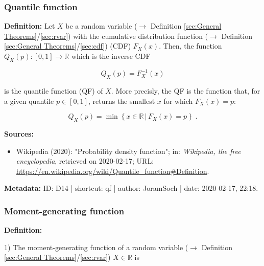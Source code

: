 \documentclass[a4paper,12pt,twoside]{book}
\begin{document}
\subsubsection[\textit{Quantile function}]{Quantile function} \label{sec:qf}
\setcounter{equation}{0}

\textbf{Definition:} Let $X$ be a random variable ($\rightarrow$ Definition \ref{sec:General Theorems}/\ref{sec:rvar}) with the cumulative distribution function ($\rightarrow$ Definition \ref{sec:General Theorems}/\ref{sec:cdf}) (CDF) $F_X(x)$. Then, the function $Q_X(p): [0,1] \to \mathbb{R}$ which is the inverse CDF

\begin{equation} \label{eq:qf-qf}
Q_X(p) = F_X^{-1}(x)
\end{equation}

is the quantile function (QF) of $X$. More precisly, the QF is the function that, for a given quantile $p \in [0,1]$, returns the smallest $x$ for which $F_X(x) = p$:

\begin{equation} \label{eq:qf-qf-prec}
Q_X(p) = \min \left\lbrace x \in \mathbb{R} \, \vert \, F_X(x) = p \right\rbrace \; .
\end{equation}


\vspace{1em}
\textbf{Sources:}
\begin{itemize}
\item Wikipedia (2020): "Probability density function"; in: \textit{Wikipedia, the free encyclopedia}, retrieved on 2020-02-17; URL: \url{https://en.wikipedia.org/wiki/Quantile_function#Definition}.
\end{itemize}


\vspace{1em}
\textbf{Metadata:} ID: D14 | shortcut: qf | author: JoramSoch | date: 2020-02-17, 22:18.
\vspace{1em}



\subsubsection[\textit{Moment-generating function}]{Moment-generating function} \label{sec:mgf}
\setcounter{equation}{0}

\textbf{Definition:}

1) The moment-generating function of a random variable ($\rightarrow$ Definition \ref{sec:General Theorems}/\ref{sec:rvar}) $X \in \mathbb{R}$ is
\end{document}

